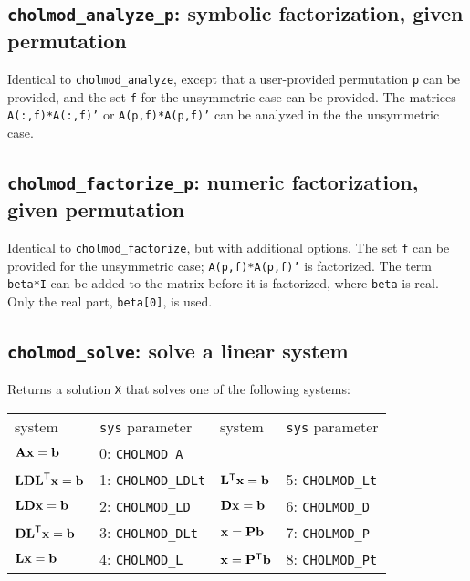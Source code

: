 \documentclass[11pt]{article}
\newcommand{\m}[1]{{\bf{#1}}}       %
\newcommand{\tr}{^{\sf T}}          %
\begin{document}
\subsection{{\tt cholmod\_analyze\_p}: symbolic factorization, given permutation}


Identical to {\tt cholmod\_analyze}, except that a user-provided
permutation {\tt p} can be provided, and the set {\tt f} for the unsymmetric case
can be provided.  The matrices {\tt A(:,f)*A(:,f)'} or {\tt A(p,f)*A(p,f)'}
can be analyzed in the the unsymmetric case.

\subsection{{\tt cholmod\_factorize\_p}: numeric factorization, given permutation}


Identical to {\tt cholmod\_factorize}, but with additional options.
The set {\tt f} can be provided for the unsymmetric case;
{\tt A(p,f)*A(p,f)'} is factorized.  The term {\tt beta*I} can be added to
the matrix before it is factorized, where {\tt beta} is real.
Only the real part, {\tt beta[0]}, is used.

\subsection{{\tt cholmod\_solve}: solve a linear system}


Returns a solution {\tt X} that solves one of the following systems:

\begin{tabular}{ll|ll}
	\hline
	system			    & {\tt sys} parameter & system		    & {\tt sys} parameter \\
	$\m{Ax}=\m{b}$		    & 0: {\tt CHOLMOD\_A}	&			    &			\\
	$\m{LDL}\tr\m{x}=\m{b}$	    & 1: {\tt CHOLMOD\_LDLt}	& $\m{L}\tr\m{x}=\m{b}$	    & 5: {\tt CHOLMOD\_Lt}	\\
	$\m{LDx}=\m{b}$		    & 2: {\tt CHOLMOD\_LD}	& $\m{Dx}=\m{b}$	    & 6: {\tt CHOLMOD\_D}	\\
	$\m{DL}\tr\m{x}=\m{b}$	    & 3: {\tt CHOLMOD\_DLt}	& $\m{x}=\m{Pb}$	    & 7: {\tt CHOLMOD\_P}	\\
	$\m{Lx}=\m{b}$		    & 4: {\tt CHOLMOD\_L}	& $\m{x}=\m{P}\tr\m{b}$	    & 8: {\tt CHOLMOD\_Pt}	\\
	\hline
\end{tabular}
\end{document}
